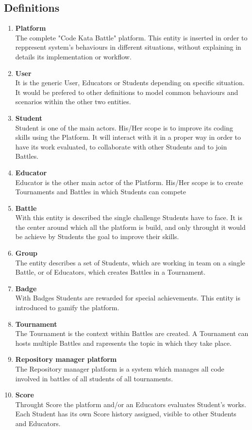 \subsection{Definitions}
\begin{enumerate}[label=$\bullet$]
    \item \textbf{Platform}\\The complete "Code Kata Battle" platform. This entity is inserted in order to reppresent system's behaviours in different situations, without explaining in details its implementation or workflow.
    \item \textbf{User}\\It is the generic User, Educators or Students depending on specific situation. It would be prefered to other definitions to model common behaviours and scenarios within the other two entities.
    \item \textbf{Student}\\Student is one of the main actors. His/Her scope is to improve its coding skills using the Platform. It will interact with it in a proper way in order to have its work evaluated, to collaborate with other Students and to join Battles.
    \item \textbf{Educator}\\Educator is the other main actor of the Platform. His/Her scope is to create Tournaments and Battles in which Students can compete
    \item \textbf{Battle}\\With this entity is described the single challenge Students have to face. It is the center around which all the platform is build, and only throught it would be achieve by Students the goal to improve their skills.
    \item \textbf{Group}\\The entity describes a set of Students, which are working in team on a single Battle, or of Educators, which creates Battles in a Tournament.
    \item \textbf{Badge}\\With Badges Students are rewarded for special achievements. This entity is introduced to gamify the platform.
    \item \textbf{Tournament}\\The Tournament is the context within Battles are created. A Tournament can hosts multiple Battles and rapresents the topic in which they take place.
    \item \textbf{Repository manager platform}\\The Repository manager platform is a system which manages all code involved in battles of all students of all tournaments.
    \item \textbf{Score}\\Throught Score the platform and/or an Educators evaluates Student's works. Each Student has its own Score history assigned, visible to other Students and Educators.
\end{enumerate}
